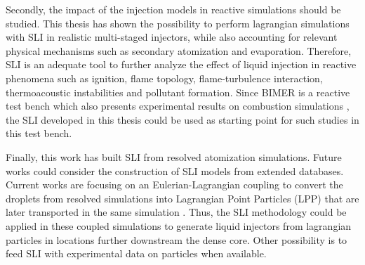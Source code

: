 Secondly, the impact of the injection models in reactive simulations should be studied. This thesis has shown the possibility to perform lagrangian simulations with SLI in realistic multi-staged injectors, while also accounting for relevant physical mechanisms such as secondary atomization and evaporation. Therefore, SLI is an adequate tool to further analyze the effect of liquid injection in reactive phenomena such as ignition, flame topology, flame-turbulence interaction, thermoacoustic instabilities and pollutant formation. Since BIMER is a reactive test bench which also presents experimental results on combustion simulations , the SLI developed in this thesis could be used as starting point for such studies in this test bench.

Finally, this work has built SLI from resolved atomization simulations. Future works could consider the construction of SLI models from extended databases. Current works are focusing on an Eulerian-Lagrangian coupling to convert the droplets from resolved simulations into Lagrangian Point Particles (LPP) that are later transported in the same simulation . Thus, the SLI methodology could be applied in these coupled simulations to generate liquid injectors from lagrangian particles in locations further downstream the dense core. Other possibility is to feed SLI with experimental data on particles when available. 
	

	
	
	
	
	
	
	
	
	





